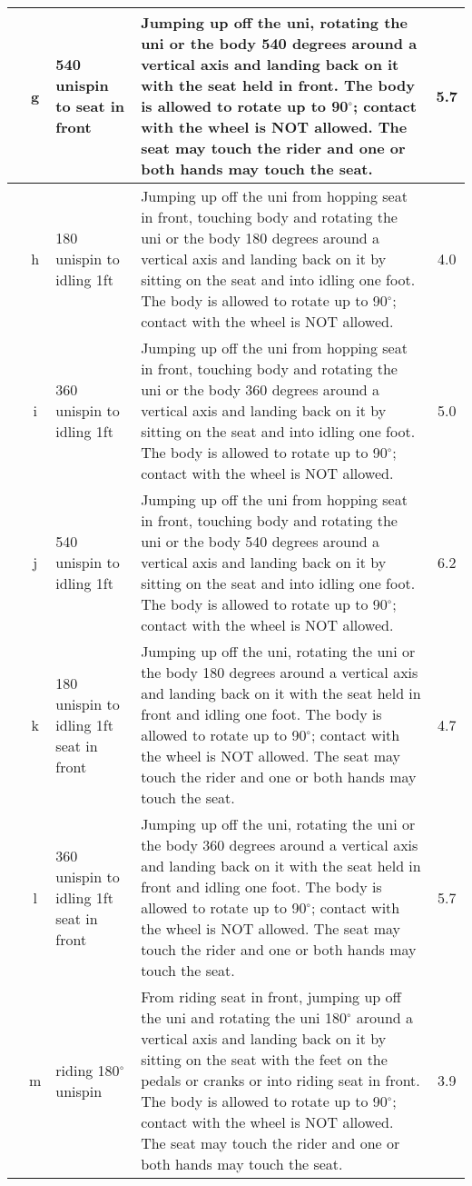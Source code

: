 \begin{longtable}{|r|c|p{4cm}|p{8cm}|c|}
\hline
  & g & 540 unispin to seat in front  & Jumping up off the uni, rotating the uni or the body 540 degrees around a vertical axis and landing back on it with the seat held in front. The body is allowed to rotate up to 90$^\circ$; contact with the wheel is NOT allowed. The seat may touch the rider and one or both hands may touch the seat.  & 5.7 \\ 
\hline
  & h & 180 unispin to idling 1ft & Jumping up off the uni from hopping seat in front, touching body and rotating the uni or the body 180 degrees around a vertical axis and landing back on it by sitting on the seat and into idling one foot. The body is allowed to rotate up to 90$^\circ$; contact with the wheel is NOT allowed.  & 4.0 \\ 
\hline
  & i & 360 unispin to idling 1ft & Jumping up off the uni from hopping seat in front, touching body and rotating the uni or the body 360 degrees around a vertical axis and landing back on it by sitting on the seat and into idling one foot. The body is allowed to rotate up to 90$^\circ$; contact with the wheel is NOT allowed.  & 5.0 \\ 
\hline
  & j & 540 unispin to idling 1ft & Jumping up off the uni from hopping seat in front, touching body and rotating the uni or the body 540 degrees around a vertical axis and landing back on it by sitting on the seat and into idling one foot. The body is allowed to rotate up to 90$^\circ$; contact with the wheel is NOT allowed.  & 6.2 \\ 
\hline
  & k & 180 unispin to idling 1ft seat in front & Jumping up off the uni, rotating the uni or the body 180 degrees around a vertical axis and landing back on it with the seat held in front and idling one foot. The body is allowed to rotate up to 90$^\circ$; contact with the wheel is NOT allowed. The seat may touch the rider and one or both hands may touch the seat.  & 4.7 \\ 
\hline
  & l & 360 unispin to idling 1ft seat in front & Jumping up off the uni, rotating the uni or the body 360 degrees around a vertical axis and landing back on it with the seat held in front and idling one foot. The body is allowed to rotate up to 90$^\circ$; contact with the wheel is NOT allowed. The seat may touch the rider and one or both hands may touch the seat.  & 5.7 \\ 
\hline
  & m & riding 180$^\circ$ unispin & From riding seat in front, jumping up off the uni and rotating the uni 180$^\circ$ around a vertical axis and landing back on it by sitting on the seat with the feet on the pedals or cranks or into riding seat in front. The body is allowed to rotate up to 90$^\circ$; contact with the wheel is NOT allowed. The seat may touch the rider and one or both hands may touch the seat. & 3.9 \\ 

\end{longtable}

